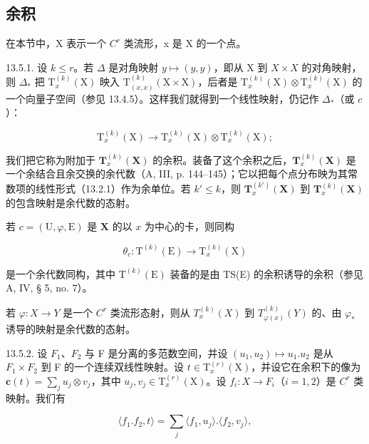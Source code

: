 \subsection{余积}

在本节中，X 表示一个 \(C^{r}\) 类流形，x 是 X 的一个点。

13.5.1. 设 \(k \leqslant r\)。若 \(\Delta\) 是对角映射 \(y \mapsto (y, y)\)，即从 X 到 \(X \times X\) 的对角映射，则 \(\Delta_*\) 把 \(\mathrm{T}_x^{(k)}(\mathrm{X})\) 映入 \(\mathrm{T}_{(x,x)}^{(k)}(\mathrm{X} \times \mathrm{X})\)，后者是 \(\mathrm{T}_{x}^{(k)}(\mathrm{X})\otimes\mathrm{T}_{x}^{(k)}(\mathrm{X})\) 的一个向量子空间（参见 13.4.5）。这样我们就得到一个线性映射，仍记作 \(\Delta_{*}\)（或 \(c\)）：

\[
\mathrm{T} _ {x} ^ {(k)} (\mathrm{X}) \rightarrow \mathrm{T} _ {x} ^ {(k)} (\mathrm{X}) \otimes \mathrm{T} _ {x} ^ {(k)} (\mathrm{X});
\]

我们把它称为附加于 \(\mathbf{T}_{x}^{(k)}(\mathbf{X})\) 的余积。装备了这个余积之后，\(\mathbf{T}_{x}^{(k)}(\mathbf{X})\) 是一个余结合且余交换的余代数（A, III, p. 144–145）；它以把每个点分布映为其常数项的线性形式（13.2.1）作为余单位。若 \(k' \leqslant k\)，则 \(\mathbf{T}_{x}^{(k')}(\mathbf{X})\) 到 \(\mathbf{T}_{x}^{(k)}(\mathbf{X})\) 的包含映射是余代数的态射。

若 \(c = (\mathrm{U},\varphi ,\mathrm{E})\) 是 \(\mathbf{X}\) 的以 \(x\) 为中心的卡，则同构

\[
\theta_ {c} \colon \mathrm{T} ^ {(k)} (\mathrm{E}) \rightarrow \mathrm{T} _ {x} ^ {(k)} (\mathrm{X})
\]

是一个余代数同构，其中 \(\mathrm{T}^{(k)}(\mathrm{E})\) 装备的是由 TS(E) 的余积诱导的余积（参见 A, IV, § 5, no. 7）。

若 \(\varphi: X \to Y\) 是一个 \(C^r\) 类流形态射，则从 \(T_x^{(k)}(X)\) 到 \(T_{\varphi(x)}^{(k)}(Y)\) 的、由 \(\varphi_*\) 诱导的映射是余代数的态射。

13.5.2. 设 \(F_{1}\)、\(F_{2}\) 与 F 是分离的多范数空间，并设 \((u_{1}, u_{2}) \mapsto u_{1}.u_{2}\) 是从 \(F_{1} \times F_{2}\) 到 F 的一个连续双线性映射。设 \(t \in \mathrm{T}_{x}^{(r)}(\mathrm{X})\)，并设它在余积下的像为 \(\boldsymbol{c}(t) = \sum_{j} u_{j} \otimes v_{j}\)，其中 \(u_{j},v_{j} \in \mathrm{T}_{x}^{(r)}(\mathrm{X})\)。设 \(f_{i}: X \to F_{i}\)（\(i=1,2\)）是 \(C^{r}\) 类映射。我们有

\[
\langle f _ {1}. f _ {2}, t \rangle = \sum_ {j} \langle f _ {1}, u _ {j} \rangle . \langle f _ {2}, v _ {j} \rangle ,
\]

